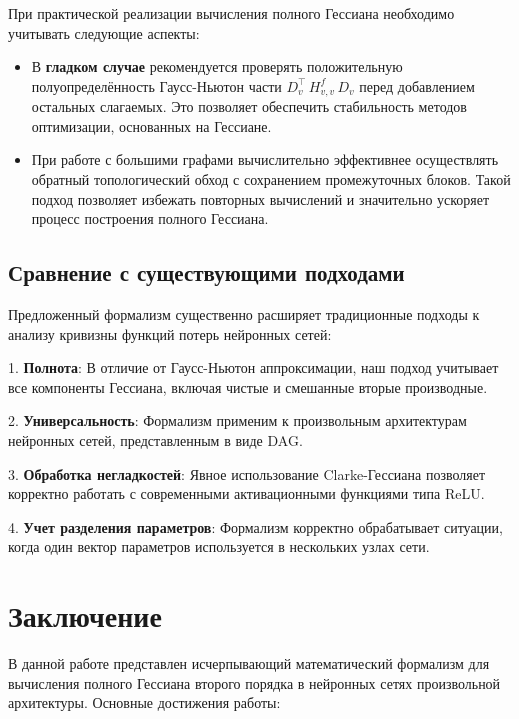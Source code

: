 \documentclass[11pt]{article}
\begin{document}
При практической реализации вычисления полного Гессиана необходимо учитывать следующие аспекты:

\begin{itemize}
  \item В \textbf{гладком случае} рекомендуется проверять положительную полуопределённость Гаусс-Ньютон части
    $D_v^\top\,H^f_{v,v}\,D_v$ перед добавлением остальных слагаемых. Это позволяет обеспечить стабильность
    методов оптимизации, основанных на Гессиане.

  \item При работе с большими графами вычислительно эффективнее осуществлять обратный топологический обход с
    сохранением промежуточных блоков. Такой подход позволяет избежать повторных вычислений и значительно
    ускоряет процесс построения полного Гессиана.
\end{itemize}

\subsection{Сравнение с существующими подходами}

Предложенный формализм существенно расширяет традиционные подходы к анализу кривизны функций потерь нейронных сетей:

1. \textbf{Полнота}: В отличие от Гаусс-Ньютон аппроксимации, наш подход учитывает все компоненты Гессиана,
включая чистые и смешанные вторые производные.

2. \textbf{Универсальность}: Формализм применим к произвольным архитектурам нейронных сетей, представленным в виде DAG.

3. \textbf{Обработка негладкостей}: Явное использование Clarke-Гессиана позволяет корректно работать с
современными активационными функциями типа ReLU.

4. \textbf{Учет разделения параметров}: Формализм корректно обрабатывает ситуации, когда один вектор
параметров используется в нескольких узлах сети.

\section{Заключение}

В данной работе представлен исчерпывающий математический формализм для вычисления полного Гессиана второго
порядка в нейронных сетях произвольной архитектуры. Основные достижения работы:
\end{document}
